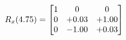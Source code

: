 \documentclass[preview]{standalone}
\begin{document}
\begin{align*}
\special{dvisvgm:raw <g id='unique000'>}R_{x}(4.75) = \begin{bmatrix}1 & 0 & 0 \\0 & +0.03 & +1.00 \\0 & -1.00 & +0.03\end{bmatrix}\special{dvisvgm:raw </g>}
\end{align*}
\end{document}
